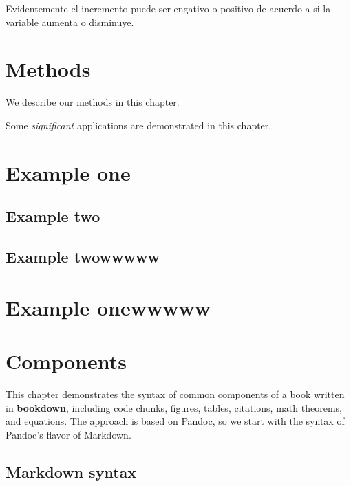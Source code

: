 \documentclass[]{krantz}
\begin{document}
Evidentemente el incremento puede ser engativo o positivo de acuerdo a si la variable aumenta o disminuye.

\hypertarget{methods}{%
\chapter{Methods}\label{methods}}

We describe our methods in this chapter.

\hypertarget{appendix-apendice}{%
\appendix {}}


Some \emph{significant} applications are demonstrated in this chapter.

\hypertarget{example-one}{%
\chapter{Example one}\label{example-one}}

\hypertarget{example-two}{%
\section{Example two}\label{example-two}}

\hypertarget{example-twowwwww}{%
\section{Example twowwwww}\label{example-twowwwww}}

\hypertarget{example-onewwwww}{%
\chapter{Example onewwwww}\label{example-onewwwww}}

\hypertarget{components}{%
\chapter{Components}\label{components}}

This chapter demonstrates the syntax of common components of a book written in \textbf{bookdown}, including code chunks, figures, tables, citations, math theorems, and equations. The approach is based on Pandoc, so we start with the syntax of Pandoc's flavor of Markdown.

\hypertarget{markdown-syntax}{%
\section{Markdown syntax}\label{markdown-syntax}}
\end{document}
